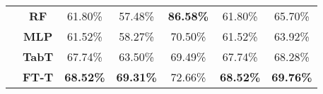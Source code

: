 \begin{table}[]
\begin{tabular}{ccccccc}
& \textbf{RF}                       & 61.80\%                        & 57.48\%                       & {\cellcolor{my_blue}\textbf{86.58\%}}                       & 61.80\%                        & 65.70\%                           \\
& {\cellcolor{my_grey}}\textbf{MLP}                      & {\cellcolor{my_grey}}61.52\%                        & {\cellcolor{my_grey}}58.27\%                       & {\cellcolor{my_grey}}70.50\%                       & {\cellcolor{my_grey}}61.52\%                        & {\cellcolor{my_grey}}63.92\%                           \\
\hhline{~------}
& \textbf{TabT}                     & 67.74\%                        & 63.50\%                       & 69.49\%                       & 67.74\%                        & 68.28\%                           \\
& {\cellcolor{my_grey}}\textbf{FT-T}                     & {\cellcolor{my_blue}\textbf{68.52\%}} & {\cellcolor{my_blue}\textbf{69.31\%}} & {\cellcolor{my_grey}72.66\%} & {\cellcolor{my_blue}\textbf{68.52\%}} & {\cellcolor{my_blue}\textbf{69.76\%}}  \\ 
\hline\hline
\end{tabular}
\label{tab:metrics-DAT2}
\end{table}

\vfill

\clearpage

\vfill

